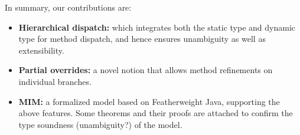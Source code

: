 In summary, our contributions are: 
\begin{itemize}
	\item \textbf{Hierarchical dispatch:} which integrates both the static type and dynamic type for method dispatch, and hence
	ensures unambiguity as well as extensibility.
	\item \textbf{Partial overrides:} a novel notion that allows method refinements on individual branches.
	\item \textbf{MIM:} a formalized model based on Featherweight Java, supporting the above features. Some theorems and their proofs
	are attached to confirm the type soundness (unambiguity?) of the model.
\end{itemize}

 